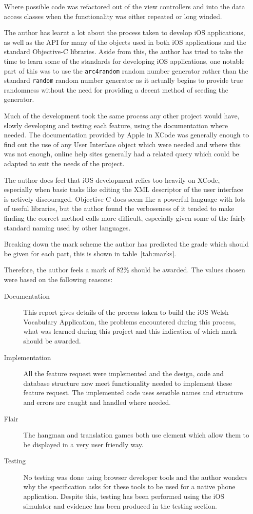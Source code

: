 \documentclass[11pt, a4paper]{article}
\begin{document}
Where possible code was refactored out of the view controllers and into the data access classes when the functionality was either repeated or long winded.

The author has learnt a lot about the process taken to develop iOS applications, as well as the API for many of the objects used in both iOS applications and the standard Objective-C libraries. Aside from this, the author has tried to take the time to learn some of the standards for developing iOS applications, one notable part of this was to use the \texttt{arc4random} random number generator rather than the standard \texttt{random} random number generator as it actually begins to provide true randomness without the need for providing a decent method of seeding the generator.

Much of the development took the same process any other project would have, slowly developing and testing each feature, using the documentation where needed. The documentation provided by Apple in XCode was generally enough to find out the use of any User Interface object which were needed and where this was not enough, online help sites generally had a related query which could be adapted to suit the needs of the project.

The author does feel that iOS development relies too heavily on XCode, especially when basic tasks like editing the XML descriptor of the user interface is actively discouraged. Objective-C does seem like a powerful language with lots of useful libraries, but the author found the verboseness of it tended to make finding the correct method calls more difficult, especially given some of the fairly standard naming used by other languages. 

Breaking down the mark scheme the author has predicted the grade which should be given for each part, this is shown in table~\ref{tab:marks}.

Therefore, the author feels a mark of 82\% should be awarded. The values chosen were based on the following reasons:

\begin{description}
\item[Documentation] This report gives details of the process taken to build the iOS Welsh Vocabulary Application, the problems encountered during this process, what was learned during this project and this indication of which mark should be awarded.
\item[Implementation] All the feature request were implemented and the design, code and database structure now meet functionality needed to implement these feature request. The implemented code uses sensible names and structure and errors are caught and handled where needed.
\item[Flair] The hangman and translation games both use element which allow them to be displayed in a very user friendly way.
\item[Testing] No testing was done using browser developer tools and the author wonders why the specification asks for these tools to be used for a native phone application. Despite this, testing has been performed using the iOS simulator and evidence has been produced in the testing section.
\end{description}
\end{document}
